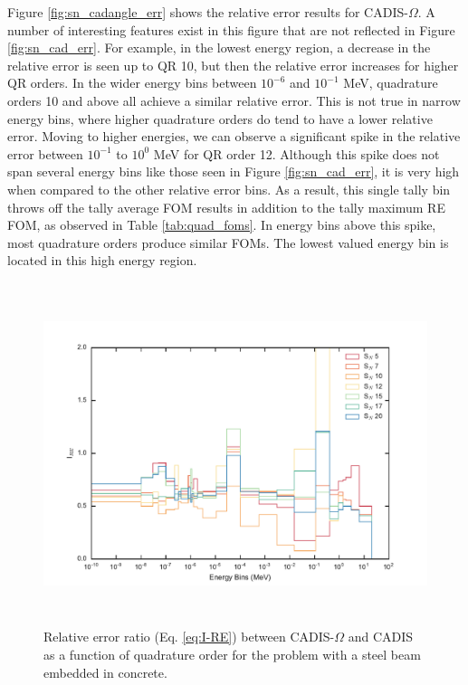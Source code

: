 Figure \ref{fig:sn_cadangle_err} shows the relative error results for
CADIS-$\Omega$. A number of interesting features exist in
this figure that are not reflected in Figure \ref{fig:sn_cad_err}. For example,
in the lowest energy region, a decrease in the relative error is seen up to QR
10, but then the relative error increases for higher QR orders. In the wider
energy bins between
$10^{-6}$ and $10^{-1}$ MeV, quadrature orders 10 and above all achieve a
similar relative error. This is not true in narrow energy bins, where higher
quadrature orders do tend to have a lower relative error. Moving to higher
energies, we can observe a significant spike in the relative error between
$10^{-1}$ to $10^{0}$ MeV for QR order 12. Although this spike does not span
several energy bins like those seen in Figure \ref{fig:sn_cad_err}, it is very
high when compared to the other relative error bins. As a result, this single
tally bin throws off the tally average FOM results in addition to the tally
maximum RE FOM, as observed in Table
\ref{tab:quad_foms}. In energy bins above this spike, most quadrature orders
produce similar FOMs. The lowest valued energy bin is located in this high
energy region.

\begin{figure}[h!]
  \centering
  \includegraphics[height=10cm]{./chapters/characterization_probs/figures/angle/prob_1/compare_err_quad.pdf}
  \caption[Relative error improvement factor (Eq. \eqref{eq:I-RE}) between CADIS-$\Omega$ and
  CADIS as a function of quadrature order for steel beam embedded in concrete.]
  {Relative error ratio (Eq. \eqref{eq:I-RE}) between CADIS-$\Omega$ and
   CADIS as a function of quadrature order for the problem with
   a steel beam embedded in concrete.}
  \label{fig:prob_1_quad_I_RE}
\end{figure}

